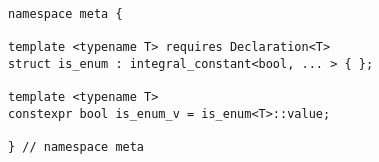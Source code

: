 
\begin{verbatim}
namespace meta {

template <typename T> requires Declaration<T>
struct is_enum : integral_constant<bool, ... > { };

template <typename T>
constexpr bool is_enum_v = is_enum<T>::value;

} // namespace meta
\end{verbatim}
